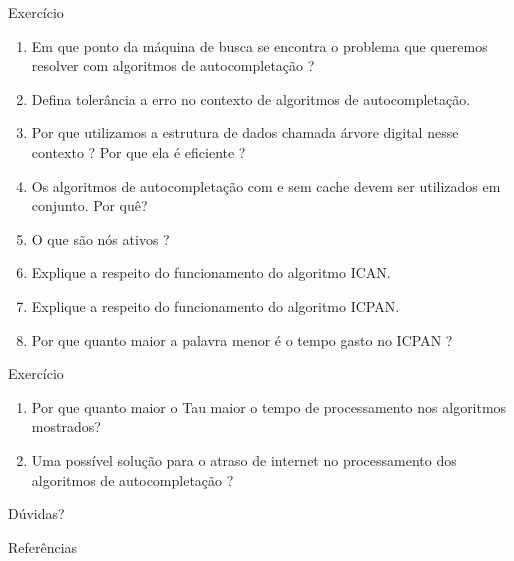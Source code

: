 \documentclass[11pt]{beamer}
\begin{document}
\begin{frame}{Exercício}

    \begin{enumerate}
        \item Em que ponto da máquina de busca se encontra o problema que queremos resolver com algoritmos de autocompletação ? \pause
        \item Defina tolerância a erro no contexto de algoritmos de autocompletação. \pause
        \item Por que utilizamos a estrutura de dados chamada árvore digital nesse contexto ? Por que ela é eficiente ? \pause
        \item Os algoritmos de autocompletação com e sem cache devem ser utilizados em conjunto. Por quê? \pause
        \item O que são nós ativos ? \pause
        \item Explique a respeito do funcionamento do algoritmo ICAN. \pause
        \item Explique a respeito do funcionamento do algoritmo ICPAN. \pause
        \item Por que quanto maior a palavra menor é o tempo gasto no ICPAN ?
    \end{enumerate}

\end{frame}

\begin{frame}{Exercício}

    \begin{enumerate}
        \item Por que quanto maior o Tau maior o tempo de processamento nos algoritmos mostrados? \pause
        \item Uma possível solução para o atraso de internet no processamento dos algoritmos de autocompletação ?
    \end{enumerate}

\end{frame}

{
\begin{frame}[standout]
  Dúvidas?
\end{frame}
}

\appendix

\begin{frame}[allowframebreaks]{Referências}

  
  

\end{frame}
\end{document}
